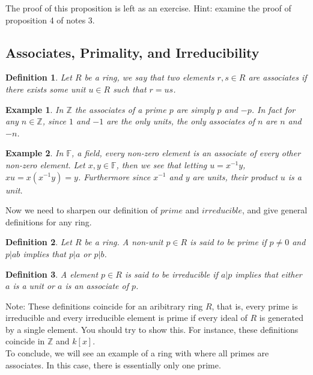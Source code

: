 \documentclass{article}
\theoremstyle{problemstyle}
\newtheorem{example}{Example}
\newtheorem{definition}{Definition}
\begin{document}
The proof of this proposition is left as an exercise. Hint: examine the proof of proposition 4 of notes 3. 

\subsection*{Associates, Primality, and Irreducibility}

\begin{definition}
Let $R$ be a ring, we say that two elements $r,s \in R$ are associates if there exists some unit $u \in R$ such that $r = us$.
\end{definition}

\begin{example}
In $\mathbb{Z}$ the associates of a prime $p$ are simply $p$ and $-p$. In fact for any $n \in \mathbb{Z}$, since $1$ and $-1$ are the only units, the only associates of $n$ are $n$ and $-n$.  
\end{example}

\begin{example}
In $\mathbb{F}$, a field, every non-zero element is an associate of every other non-zero element. Let $x,y \in \mathbb{F}$, then we see that letting $u =x^{-1}y$,  $xu = x(x^{-1}y) = y$. Furthermore since $x^{-1}$ and $y$ are units, their product $u$ is a unit.   
\end{example}

Now we need to sharpen our definition of $prime$ and $irreducible$, and give general definitions for any ring. 

\begin{definition}
Let $R$ be a ring. A non-unit $p \in R$ is said to be prime if $p \neq 0$ and $p|ab$ implies that $p|a$ or $p|b$. 
\end{definition}

\begin{definition}
A element $p \in R$ is said to be irreducible if $a|p$ implies that either $a$ is a unit or $a$ is an associate of $p$. 
\end{definition}

Note: These definitions coincide for an aribitrary ring $R$, that is, every prime is irreducible and every irreducible element is prime if every ideal of $R$ is generated by a single element. You should try to show this. For instance, these definitions coincide in $\mathbb{Z}$ and $k[x]$.\\

To conclude, we will see an example of a ring with where all primes are associates. In this case, there is essentially only one prime. 
\end{document}
